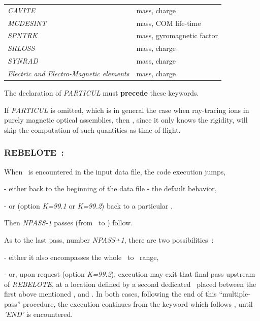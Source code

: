\bigskip           

\begin{tabular}{>{\sl}l!{~:}l}
  CAVITE    & mass,  charge \\
  MCDESINT  & mass,  COM  life-time\\
  SPNTRK    & mass,  gyromagnetic factor \\
  SRLOSS    & mass, charge \\
  SYNRAD    & mass, charge \\
  Electric and Electro-Magnetic elements
            & mass, charge 
\end{tabular}
\bigskip           

\noindent The declaration of \textsl{PARTICUL} must \textbf{precede} these keywords. 

\medskip

\noindent
If \textsl{PARTICUL} is omitted, which is in general the case when ray-tracing ions
in purely magnetic optical assemblies, then \zgoubi, since it  only knows the rigidity, 
 will  skip the computation of  such quantities as  time of flight. 



 \newpage

\subsubsection*{REBELOTE~: \REBELOTETitl} \label{REBELOTE}    
\medskip


When \REBELOTE\ is encountered in the input data file, the code execution jumps, 

- either back to the beginning of the data file - the default behavior,  

- or (option \textsl{K=99.1} or \textsl{K=99.2}) back to a particular \LABEL. 

\noindent  Then  \textsl{NPASS-1} passes (from \LABEL\ to  \REBELOTE) follow.  

\noindent As to the last pass, number  \textsl{NPASS+1}, there are two possibilities~: 

- either it also encompasses the whole \LABEL\ to  \REBELOTE\ range, 

- or, upon request (option \textsl{K=99.2}),  execution may exit that final  pass upstream of 
\textsl{REBELOTE}, at a location defined by a second   dedicated \LABEL\ placed  between 
the first above mentioned \LABEL, and \REBELOTE. 
In both cases, following the end of this ``multiple-pass'' procedure, 
the execution  continues from the keyword which follows \REBELOTE, until \textsl{'END'} is encountered. 


